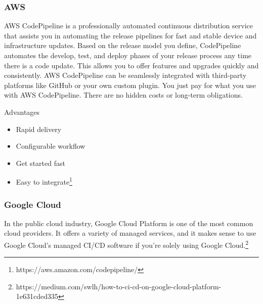%
\subsubsection{AWS}
%

AWS CodePipeline is a professionally automated continuous distribution service that assists you in automating the release pipelines for fast and stable device and infrastructure updates. Based on the release model you define, CodePipeline automates the develop, test, and deploy phases of your release process any time there is a code update. This allows you to offer features and upgrades quickly and consistently. AWS CodePipeline can be seamlessly integrated with third-party platforms like GitHub or your own custom plugin. You just pay for what you use with AWS CodePipeline. There are no hidden costs or long-term obligations.


Advantages
   \begin{itemize}
     \item Rapid delivery
     \item Configurable workflow
     \item Get started fast
     \item Easy to integrate\footnote{https://aws.amazon.com/codepipeline/}   
   \end{itemize}
   
   

%
\subsubsection{Google Cloud}
%
In the public cloud industry, Google Cloud Platform is one of the most common cloud providers. It offers a variety of managed services, and it makes sense to use Google Cloud's managed CI/CD software if you're solely using Google Cloud.\footnote{https://medium.com/swlh/how-to-ci-cd-on-google-cloud-platform-1e631cded335}


%
